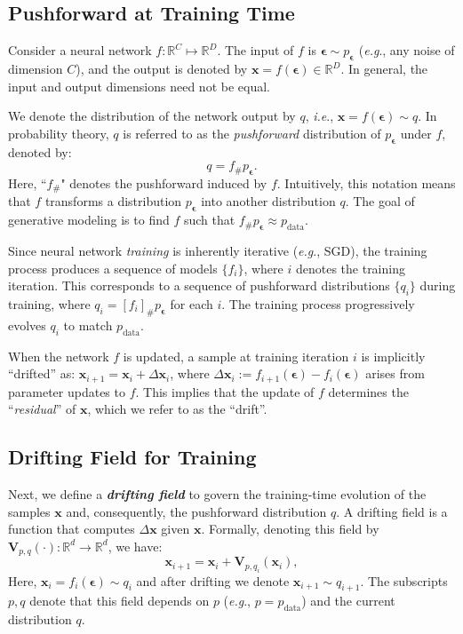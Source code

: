 \documentclass{article}
\newcommand{\R}{\mathbb{R}}
\newcommand{\vv}[1]{\mathbf{#1}}
\newcommand{\x}{\vv{x}}
\newcommand{\V}{\vv{V}}
\newcommand{\e}{{\boldsymbol{\epsilon}}}
\def\onedot{.}
\def\eg{\emph{e.g}\onedot} \def\Eg{\emph{E.g}\onedot}
\def\ie{\emph{i.e}\onedot} \def\Ie{\emph{I.e}\onedot}
\theoremstyle{plain}
\theoremstyle{definition}
\theoremstyle{remark}
\begin{document}
\subsection{Pushforward at Training Time}
\label{subsec:training_time_pushforward}

Consider a neural network $f: \mathbb{R}^C \mapsto \mathbb{R}^D$. The input of $f$ is $\e \sim p_{\e}$ (\eg, any noise of dimension $C$), and the output is denoted by $\x = f(\e) \in \mathbb{R}^D$. In general, the input and output dimensions need not be equal.

We denote the distribution of the network output by $q$, \ie, $\x = f(\e) \sim q$.
In probability theory, $q$ is referred to as the \textit{pushforward} distribution of $p_\e$ under $f$, denoted by:
\begin{equation}
q = f_{\#}p_\e.
\end{equation}
Here, ``$f_{\#}$" denotes the pushforward induced by $f$.
Intuitively, this notation means that $f$ transforms a distribution $p_{\e}$ into another distribution $q$.
The goal of generative modeling is to find $f$ such that $f_{\#}p_{\e} \approx p_\text{data}$.

Since neural network \textit{training} is inherently iterative (\eg, SGD), the training process produces a sequence of models $\{f_i\}$, where $i$ denotes the training iteration.
This corresponds to a sequence of pushforward distributions $\{q_i\}$ during training, where
$q_i = [f_i]_{\#}p_{\e}$ for each $i$.
The training process progressively evolves $q_i$ to match $p_{\text{data}}$.

When the network $f$ is updated,
a sample at training iteration $i$ is implicitly ``drifted'' as:
$\x_{i+1} = \x_{i} + \Delta\x_{i}$, where $ \Delta\x_{i}:=f_{i+1}(\e) - f_{i}(\e)$ arises from parameter updates to $f$.
This implies that the update of $f$ determines the ``\textit{residual}'' of $\x$, which we refer to as the ``drift''.

\subsection{Drifting Field for Training}
\label{subsec:training_objective}

Next, we define a \emph{\textbf{drifting field}} to govern the training-time evolution of the samples $\x$ and, consequently, the pushforward distribution $q$.
A drifting field is a function that computes $ \Delta\x$ given $\x$. Formally, denoting this field by $\V_{p,q}(\cdot)\colon \R^d \to \R^d$, we have:
\begin{equation}
\x_{i+1}=\x_i+\V_{p,q_i}(\x_i),
\end{equation}
Here, $\x_i=f_i(\e) \sim q_i$ and after drifting we denote $\x_{i+1}\sim q_{i+1}$.
The subscripts $p,q$ denote that this field depends on $p$ (\eg, $p=p_\text{data}$) and the current distribution $q$.
\end{document}
